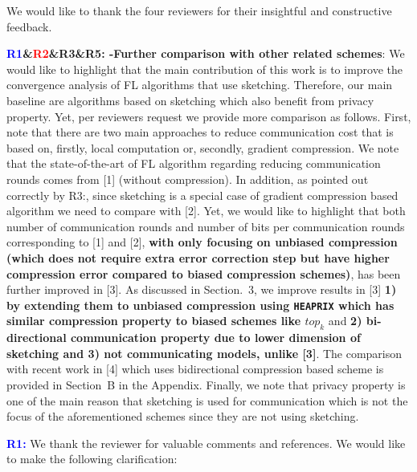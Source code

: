 \documentclass{article}
\begin{document}
We would like to thank the four reviewers for their insightful and constructive feedback. 

\textbf{\textcolor{blue}{R1}\&\textcolor{red}{R2}\&\textbf{\color{yellow!50!black}R3}\&\textbf{\textcolor{green!50!black}{R5:}} -Further comparison with other related schemes}: We would like to highlight that the main contribution of this work is to improve the convergence analysis of FL algorithms that use sketching. 
Therefore, our main baseline are algorithms based on sketching which also {benefit from privacy property}. 
Yet, per reviewers request we provide more comparison as follows. 
First, note that there are two main approaches to reduce communication cost that is based on, firstly, local computation or, secondly, gradient compression. 
We note that the state-of-the-art of FL algorithm regarding reducing communication rounds comes from [1] (without compression). 
In addition, as pointed out correctly by \textcolor{yellow!50!black}{R3:}, since sketching is a special case of gradient compression based algorithm we need to compare with [2]. 
Yet, we would like to highlight that both number of communication rounds and number of bits per communication rounds corresponding to [1] and [2], \textbf{with only focusing on unbiased compression (which does not require extra error correction step but have higher compression error compared to biased compression schemes)}, has been further improved in [3]. 
As discussed in Section.~3, we improve results in [3] \textbf{1) by extending them to unbiased compression using \texttt{HEAPRIX} which has similar compression property to biased schemes like $top_k$} and \textbf{2)  bi-directional communication property due to lower dimension of sketching and 3) not communicating models, unlike [3]}.  
The comparison with recent work in [4] which uses bidirectional compression based scheme is provided in Section~B in the Appendix. 
Finally, we note that privacy property is one of the main reason that sketching is used for communication which is not the focus of the aforementioned schemes since they are not using sketching.



\textbf{\textcolor{blue}{R1:}} We thank the reviewer for valuable comments and references. We would like to make the following clarification:\vspace{-1.5pt} 
\end{document}
